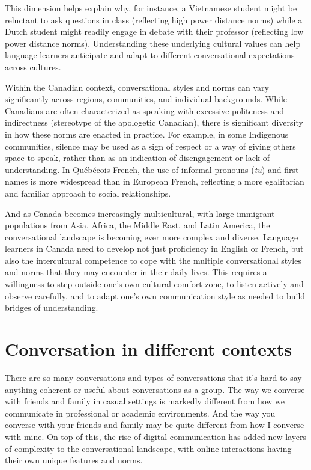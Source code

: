 This dimension helps explain why, for instance, a Vietnamese student might be reluctant to ask questions in class (reflecting high power distance norms) while a Dutch student might readily engage in debate with their professor (reflecting low power distance norms). Understanding these underlying cultural values can help language learners anticipate and adapt to different conversational expectations across cultures.

Within the Canadian context, conversational styles and norms can vary significantly across regions, communities, and individual backgrounds. While Canadians are often characterized as speaking with excessive politeness and indirectness (stereotype of the apologetic Canadian), there is significant diversity in how these norms are enacted in practice. For example, in some Indigenous communities, silence may be used as a sign of respect or a way of giving others space to speak, rather than as an indication of disengagement or lack of understanding. In Québécois French, the use of informal pronouns (\textit{tu}) and first names is more widespread than in European French, reflecting a more egalitarian and familiar approach to social relationships.

And as Canada becomes increasingly multicultural, with large immigrant populations from Asia, Africa, the Middle East, and Latin America, the conversational landscape is becoming ever more complex and diverse. Language learners in Canada need to develop not just proficiency in English or French, but also the intercultural competence to cope with the multiple conversational styles and norms that they may encounter in their daily lives. This requires a willingness to step outside one's own cultural comfort zone, to listen actively and observe carefully, and to adapt one's own communication style as needed to build bridges of understanding.

\section{Conversation in different contexts}

There are so many conversations and types of conversations that it's hard to say anything coherent or useful about conversations as a group. The way we converse with friends and family in casual settings is markedly different from how we communicate in professional or academic environments. And the way you converse with your friends and family may be quite different from how I converse with mine. On top of this, the rise of digital communication has added new layers of complexity to the conversational landscape, with online interactions having their own unique features and norms.

